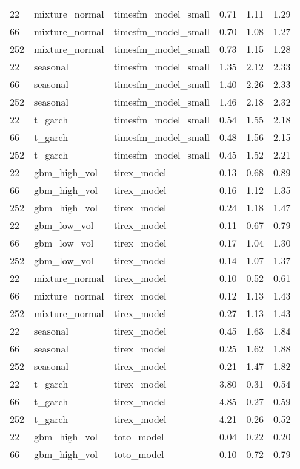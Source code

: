 {\begin{tabular}{lllrrr}
\midrule
22 & mixture\_normal & timesfm\_model\_small & 0.71 & 1.11 & 1.29 \\
66 & mixture\_normal & timesfm\_model\_small & 0.70 & 1.08 & 1.27 \\
252 & mixture\_normal & timesfm\_model\_small & 0.73 & 1.15 & 1.28 \\
\midrule
22 & seasonal & timesfm\_model\_small & 1.35 & 2.12 & 2.33 \\
66 & seasonal & timesfm\_model\_small & 1.40 & 2.26 & 2.33 \\
252 & seasonal & timesfm\_model\_small & 1.46 & 2.18 & 2.32 \\
\midrule
22 & t\_garch & timesfm\_model\_small & 0.54 & 1.55 & 2.18 \\
66 & t\_garch & timesfm\_model\_small & 0.48 & 1.56 & 2.15 \\
252 & t\_garch & timesfm\_model\_small & 0.45 & 1.52 & 2.21 \\
\midrule
22 & gbm\_high\_vol & tirex\_model & 0.13 & 0.68 & 0.89 \\
66 & gbm\_high\_vol & tirex\_model & 0.16 & 1.12 & 1.35 \\
252 & gbm\_high\_vol & tirex\_model & 0.24 & 1.18 & 1.47 \\
\midrule
22 & gbm\_low\_vol & tirex\_model & 0.11 & 0.67 & 0.79 \\
66 & gbm\_low\_vol & tirex\_model & 0.17 & 1.04 & 1.30 \\
252 & gbm\_low\_vol & tirex\_model & 0.14 & 1.07 & 1.37 \\
\midrule
22 & mixture\_normal & tirex\_model & 0.10 & 0.52 & 0.61 \\
66 & mixture\_normal & tirex\_model & 0.12 & 1.13 & 1.43 \\
252 & mixture\_normal & tirex\_model & 0.27 & 1.13 & 1.43 \\
\midrule
22 & seasonal & tirex\_model & 0.45 & 1.63 & 1.84 \\
66 & seasonal & tirex\_model & 0.25 & 1.62 & 1.88 \\
252 & seasonal & tirex\_model & 0.21 & 1.47 & 1.82 \\
\midrule
22 & t\_garch & tirex\_model & 3.80 & 0.31 & 0.54 \\
66 & t\_garch & tirex\_model & 4.85 & 0.27 & 0.59 \\
252 & t\_garch & tirex\_model & 4.21 & 0.26 & 0.52 \\
\midrule
22 & gbm\_high\_vol & toto\_model & 0.04 & 0.22 & 0.20 \\
66 & gbm\_high\_vol & toto\_model & 0.10 & 0.72 & 0.79 \\

\end{tabular}}
